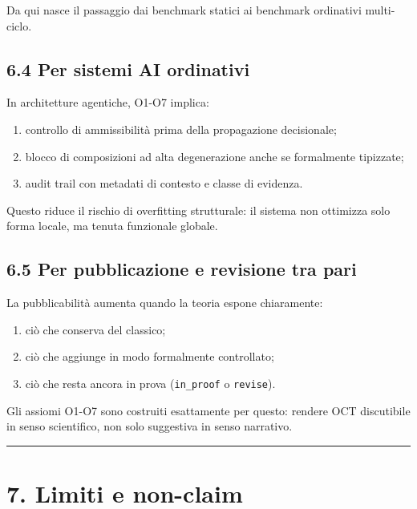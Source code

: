 Da qui nasce il passaggio dai benchmark statici ai benchmark ordinativi multi-ciclo.

\subsection{6.4 Per sistemi AI ordinativi}

In architetture agentiche, O1-O7 implica:

\begin{enumerate}
\def\labelenumi{\arabic{enumi}.}
\tightlist
\item
  controllo di ammissibilità prima della propagazione decisionale;
\item
  blocco di composizioni ad alta degenerazione anche se formalmente tipizzate;
\item
  audit trail con metadati di contesto e classe di evidenza.
\end{enumerate}

Questo riduce il rischio di overfitting strutturale: il sistema non ottimizza solo forma locale, ma tenuta funzionale globale.

\subsection{6.5 Per pubblicazione e revisione tra pari}

La pubblicabilità aumenta quando la teoria espone chiaramente:

\begin{enumerate}
\def\labelenumi{\arabic{enumi}.}
\tightlist
\item
  ciò che conserva del classico;
\item
  ciò che aggiunge in modo formalmente controllato;
\item
  ciò che resta ancora in prova (\texttt{in\_proof} o \texttt{revise}).
\end{enumerate}

Gli assiomi O1-O7 sono costruiti esattamente per questo: rendere OCT discutibile in senso scientifico, non solo suggestiva in senso narrativo.

\begin{center}\rule{0.5\linewidth}{0.5pt}\end{center}

\section{7. Limiti e non-claim}

